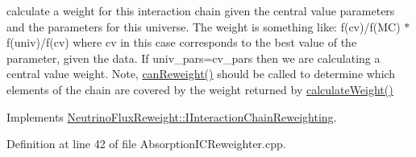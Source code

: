 calculate a weight for this interaction chain given the central value parameters and the parameters for this universe. The weight is something like\-: f(cv)/f(M\-C) $\ast$ f(univ)/f(cv) where cv in this case corresponds to the best value of the parameter, given the data. If univ\-\_\-pars=cv\-\_\-pars then we are calculating a central value weight. Note, \hyperlink{class_neutrino_flux_reweight_1_1_absorption_i_c_reweighter_adb94609e23ec8ee9123abf30d52fae40}{can\-Reweight()} should be called to determine which elements of the chain are covered by the weight returned by \hyperlink{class_neutrino_flux_reweight_1_1_absorption_i_c_reweighter_a07104ede5adc45dfeda61fc90004bec3}{calculate\-Weight()} 



Implements \hyperlink{class_neutrino_flux_reweight_1_1_i_interaction_chain_reweighting_ae28403553637013fdc720674ee24c7c5}{Neutrino\-Flux\-Reweight\-::\-I\-Interaction\-Chain\-Reweighting}.



Definition at line 42 of file Absorption\-I\-C\-Reweighter.\-cpp.


